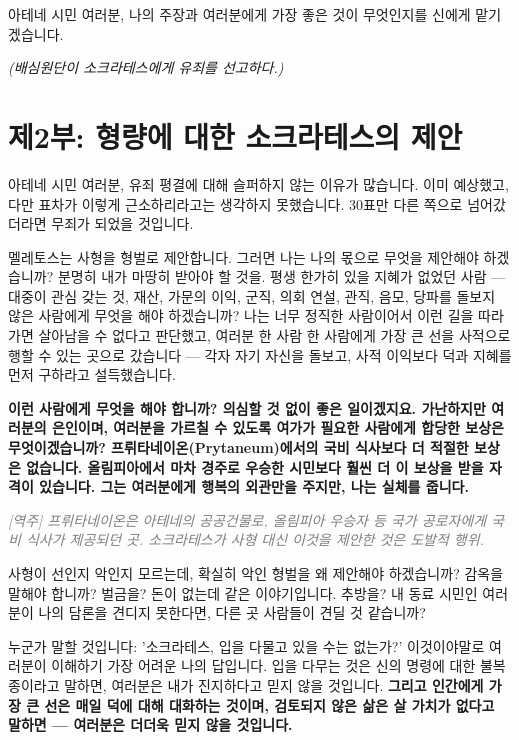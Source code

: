 \documentclass[11pt, a4paper]{article}
\newcommand{\tnote}[1]{\par\noindent\textit{\textcolor{gray}{[역주] #1}}\par\smallskip}
\begin{document}
아테네 시민 여러분, 나의 주장과 여러분에게 가장 좋은 것이 무엇인지를 신에게 맡기겠습니다.


\begin{center}\textit{(배심원단이 소크라테스에게 유죄를 선고하다.)}\end{center}


\bigskip


\newpage
\section{제2부: 형량에 대한 소크라테스의 제안}


아테네 시민 여러분, 유죄 평결에 대해 슬퍼하지 않는 이유가 많습니다. 이미 예상했고, 다만 표차가 이렇게 근소하리라고는 생각하지 못했습니다. 30표만 다른 쪽으로 넘어갔더라면 무죄가 되었을 것입니다.


멜레토스는 사형을 형벌로 제안합니다. 그러면 나는 나의 몫으로 무엇을 제안해야 하겠습니까? 분명히 내가 마땅히 받아야 할 것을. 평생 한가히 있을 지혜가 없었던 사람 — 대중이 관심 갖는 것, 재산, 가문의 이익, 군직, 의회 연설, 관직, 음모, 당파를 돌보지 않은 사람에게 무엇을 해야 하겠습니까? 나는 너무 정직한 사람이어서 이런 길을 따라가면 살아남을 수 없다고 판단했고, 여러분 한 사람 한 사람에게 가장 큰 선을 사적으로 행할 수 있는 곳으로 갔습니다 — 각자 자기 자신을 돌보고, 사적 이익보다 덕과 지혜를 먼저 구하라고 설득했습니다.


\textbf{이런 사람에게 무엇을 해야 합니까? 의심할 것 없이 좋은 일이겠지요. 가난하지만 여러분의 은인이며, 여러분을 가르칠 수 있도록 여가가 필요한 사람에게 합당한 보상은 무엇이겠습니까? 프뤼타네이온(Prytaneum)에서의 국비 식사보다 더 적절한 보상은 없습니다. 올림피아에서 마차 경주로 우승한 시민보다 훨씬 더 이 보상을 받을 자격이 있습니다. 그는 여러분에게 행복의 외관만을 주지만, 나는 실체를 줍니다.}


\tnote{프뤼타네이온은 아테네의 공공건물로, 올림피아 우승자 등 국가 공로자에게 국비 식사가 제공되던 곳. 소크라테스가 사형 대신 이것을 제안한 것은 도발적 행위.}


사형이 선인지 악인지 모르는데, 확실히 악인 형벌을 왜 제안해야 하겠습니까? 감옥을 말해야 합니까? 벌금을? 돈이 없는데 같은 이야기입니다. 추방을? 내 동료 시민인 여러분이 나의 담론을 견디지 못한다면, 다른 곳 사람들이 견딜 것 같습니까?


누군가 말할 것입니다: '소크라테스, 입을 다물고 있을 수는 없는가?' 이것이야말로 여러분이 이해하기 가장 어려운 나의 답입니다. 입을 다무는 것은 신의 명령에 대한 불복종이라고 말하면, 여러분은 내가 진지하다고 믿지 않을 것입니다. \textbf{그리고 인간에게 가장 큰 선은 매일 덕에 대해 대화하는 것이며, 검토되지 않은 삶은 살 가치가 없다고 말하면 — 여러분은 더더욱 믿지 않을 것입니다.}
\end{document}
